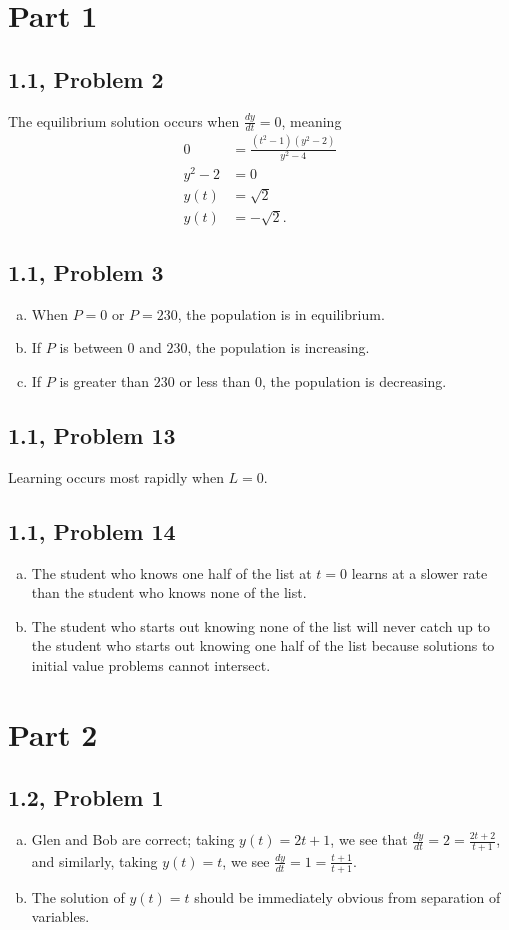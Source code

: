 \documentclass[12pt]{mypackage}
\begin{document}
\section{Part 1}%
\subsection{1.1, Problem 2}%
The equilibrium solution occurs when $\frac{dy}{dt} = 0$, meaning
\begin{align*}
  0 &= \frac{\left(t^2 - 1\right)\left(y^2 - 2\right)}{y^2 - 4}\\
  y^2 - 2 &= 0\\
  y(t) &= \sqrt{2}\\
  y(t) &= -\sqrt{2}.
\end{align*}
\subsection{1.1, Problem 3}%
\begin{enumerate}[(a)]
  \item When $P = 0$ or $P = 230$, the population is in equilibrium.
  \item If $P$ is between $0$ and $230$, the population is increasing.
  \item If $P$ is greater than $230$ or less than $0$, the population is decreasing.
\end{enumerate}
\subsection{1.1, Problem 13}%
Learning occurs most rapidly when $L = 0$.
\subsection{1.1, Problem 14}%
\begin{enumerate}[(a)]
  \item The student who knows one half of the list at $t=0$ learns at a slower rate than the student who knows none of the list.
  \item The student who starts out knowing none of the list will never catch up to the student who starts out knowing one half of the list because solutions to initial value problems cannot intersect.
\end{enumerate}
\section{Part 2}%
\subsection{1.2, Problem 1}%
\begin{enumerate}[(a)]
  \item Glen and Bob are correct; taking $y(t) = 2t+1$, we see that $\frac{dy}{dt} = 2 = \frac{2t+2}{t+1}$, and similarly, taking $y(t) = t$, we see $\frac{dy}{dt} = 1 = \frac{t+1}{t+1}$.
  \item The solution of $y(t) = t$ should be immediately obvious from separation of variables.
\end{enumerate}
\end{document}
